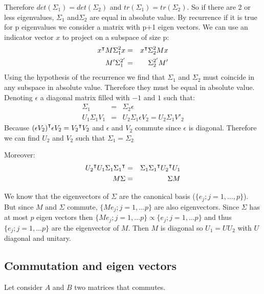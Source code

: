 \documentclass{article}
\begin{document}
Therefore \(det(\Sigma_1) = det(\Sigma_2)\) and \(tr(\Sigma_1) = tr(\Sigma_2)\). 
So if there are 2 or less eigenvalues, \(\Sigma_1\) and\(\Sigma_2\) are equal in absolute value. 
By recurrence if it is true for p eigenvalues we consider a matrix with p+1 eigen vectors.
We can use an indicator vector \(x\) to project on a subspace of size p:
\begin{eqnarray*}
{x}^\intercal M \Sigma_1^2 x &=& {x}^\intercal \Sigma_2^2  M x \\
M' \Sigma_1^{2'} &=& \Sigma_2^{2'} M' \\
\end{eqnarray*}
Using the hypothesis of the recurrence we find that \(\Sigma_1\) and \(\Sigma_2\) must coincide in any subspace in absolute value.
Therefore they must be equal in absolute value. Denoting \(\epsilon\) a diagonal matrix filled with \(-1\) and \(1\) such that:
\begin{eqnarray*}
\Sigma_1 &=& \Sigma_2 \epsilon  \\
U_1 \Sigma_1 V_1 &=& U_2 \Sigma_1 \epsilon V_2 = U_2 \Sigma_1 V'_2
\end{eqnarray*}
Because \( {(\epsilon V_2)}^\intercal \epsilon V_2 = {V_2}^\intercal V_2   \) and \(\epsilon\) and \(V_2\) commute since \(\epsilon \) is diagonal. 
Therefore we can find \(U_2\) and \(V_2\) such that \(\Sigma_1 = \Sigma_2\)

\bigskip

Moreover:
\begin{eqnarray*}
{U_2}^\intercal U_1 \Sigma_1 {\Sigma_1}^\intercal &=&  \Sigma_1 {\Sigma_1}^\intercal  {U_2}^\intercal U_1  \\
M\Sigma &=&  \Sigma M\\
\end{eqnarray*}

We know that the eigenvectors of \(\Sigma\) are the canonical basis (\(\{e_j; j = 1 , \ldots, p \}\)). 
But since \(M\) and \(\Sigma\) commute, \(\{M e_j; j = 1 , \ldots p \}\) are also eigenvectors.
Since \(\Sigma\) has at most \(p\) eigen vectors then \(\{M e_j; j = 1 , \ldots p \} \propto \{e_j; j = 1 , \ldots p \}\)
and thus \(\{e_j; j = 1 , \ldots p \}\) are the eigenvector of \(M\). Then \(M\) is diagonal so \(U_1 = U U_2\) with \(U\) diagonal and unitary.

\subsection{Commutation and eigen vectors}
\label{sec:org2b277c9}
Let consider \(A\) and \(B\) two matrices that commutes. 
\end{document}
